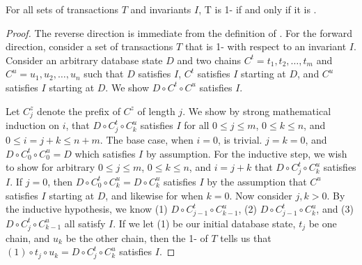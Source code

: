 \begin{theorem}\label{thm:one-is-enough}
  For all sets of transactions $T$ and invariants $I$, T is 1-\iconfluent{} if
  and only if it is \iconfluent{}.
\end{theorem}
\begin{proof}
  The reverse direction is immediate from the definition of \iconfluence{}. For
  the forward direction, consider a set of transactions $T$ that is
  1-\iconfluent{} with respect to an invariant $I$. Consider an arbitrary
  database state $D$ and two chains $C^t = t_1, t_2, \ldots, t_m$ and $C^u =
  u_1, u_2, \ldots, u_n$ such that $D$ satisfies $I$, $C^t$ satisfies $I$
  starting at $D$, and $C^u$ satisfies $I$ starting at $D$. We show $D \circ
  C^t \circ C^u$ satisfies $I$.

  Let $C^z_j$ denote the prefix of $C^z$ of length $j$. We show by strong
  mathematical induction on $i$, that $D \circ C^t_j \circ C^u_k$ satisfies $I$
  for all $0 \leq j \leq m$, $0 \leq k \leq n$, and $0 \leq i = j + k \leq n +
  m$.
  The base case, when $i = 0$, is trivial. $j = k = 0$, and $D \circ C^t_0
  \circ C^u_0 = D$ which satisfies $I$ by assumption.
  For the inductive step, we wish to show for arbitrary $0 \leq j \leq m$, $0
  \leq k \leq n$, and $i = j + k$ that $D \circ C^t_j \circ C^u_k$ satisfies
  $I$. If $j = 0$, then $D \circ C^t_0 \circ C^u_k = D \circ C^u_k$ satisfies
  $I$ by the assumption that $C^u$ satisfies $I$ starting at $D$, and likewise
  for when $k = 0$. Now consider $j, k > 0$. By the inductive hypothesis, we
  know
    (1) $D \circ C^t_{j-1} \circ C^u_{k-1}$,
    (2) $D \circ C^t_{j-1} \circ C^u_{k}$, and
    (3) $D \circ C^t_{j}   \circ C^u_{k-1}$
  all satisfy $I$. If we let (1) be our initial database state, $t_j$ be one
  chain, and $u_k$ be the other chain, then the 1-\iconfluence{} of $T$ tells
  us that $(1) \circ t_j \circ u_k = D \circ C^t_j \circ C^u_k$ satisfies
  $I$.
\end{proof}

\newcommand{\baseedges}{
  \begin{scope}[on background layer]
    \draw[txn] (03) -- (13) node[midway, above]{$u_1$};
    \draw[txn] (13) -- (23) node[midway, above]{$u_2$};
    \draw[txn] (23) -- (33) node[midway, above]{$u_3$};
    \draw[txn] (03) -- (02) node[midway, left]{$t_1$};
    \draw[txn] (02) -- (01) node[midway, left]{$t_2$};
    \draw[txn] (01) -- (00) node[midway, left]{$t_3$};
    \draw[dtxn] (00) -- (30);
    \draw[dtxn] (33) -- (30);
  \end{scope}
}

